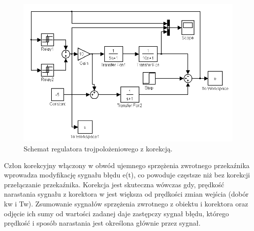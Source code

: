 \documentclass[a4paper,10pt]{article}
\begin{document}
\begin{figure}[!h]
    \centering
	\includegraphics[width=120mm]{CW3-schemat-3k.png}
	\caption{Schemat regulatora trojpolożeniowego z korekcją.}
    \label{fig:Rysunek}
\end{figure}
Człon korekcyjny włączony w obwód ujemnego sprzężenia zwrotnego przekaźnika wprowadza modyfikację sygnału
błędu e(t), co powoduje częstsze niż bez korekcji przełączanie przekaźnika. Korekcja jest skuteczna
wówczas gdy, prędkość narastania sygnału z korektora w jest większa od prędkości zmian wejścia (dobór kw i Tw). Zsumowanie sygnałów sprzężenia zwrotnego z obiektu i korektora oraz odjęcie ich sumy od wartości zadanej daje zastępczy sygnał błędu, którego prędkość i sposób narastania jest określona głównie przez sygnał. 

\newpage
\end{document}
